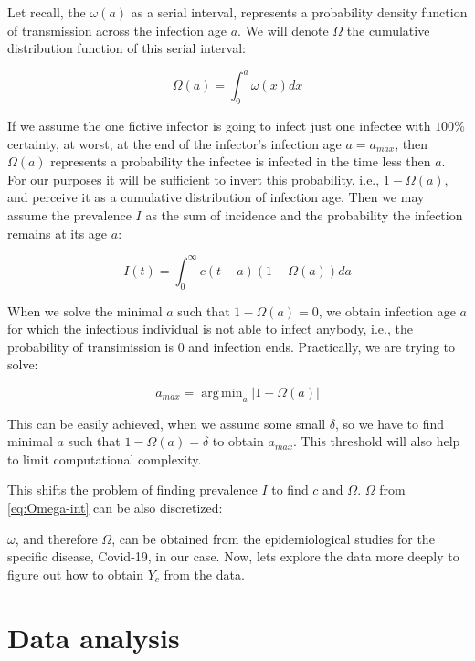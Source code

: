 \documentclass[
  digital, %
  oneside, %
  lof,     %
  lot,     %
]{fithesis4}
\DeclareMathOperator*{\argmin}{arg\,min}
\begin{document}
Let recall, the $\omega(a)$ as a serial interval, represents
a probability density function of transmission across
the infection age $a$.
We will denote $\Omega$ the cumulative distribution function
of this serial interval:

\begin{equation}\label{eq:Omega-int}
  \Omega(a) = \int_{0}^a \omega(x) dx
\end{equation}

If we assume the one fictive infector is going to infect
just one infectee with $100\%$ certainty, at worst, at the
end of the infector's infection age $a = a_{max}$, then
$\Omega(a)$ represents a probability the infectee is infected
in the time less then $a$.
For our purposes it will be sufficient to invert this probability,
i.e., $1 - \Omega(a)$, and perceive it as a cumulative distribution
of infection age. Then we may assume the prevalence $I$ as the sum
of incidence and the probability the infection remains at its
age $a$:

\begin{equation}\label{eq:prevalence-int}
  I(t) = \int_0^{\infty} c(t - a) (1 - \Omega(a)) da
\end{equation}

When we solve the minimal $a$ such
that $1 - \Omega(a) = 0$, we obtain infection age $a$ for which
the infectious individual is not able
to infect anybody, i.e., the probability of transimission
is $0$ and infection ends.
Practically, we are trying to solve:

\begin{equation}
  a_{max} = \argmin_a \left| 1 - \Omega(a) \right|
\end{equation}

This can be easily achieved, when we assume some small $\delta$,
so we have to find minimal $a$ such that $1 - \Omega(a) = \delta$
to obtain $a_{max}$. This threshold will also help to limit
computational complexity.

This shifts the problem of finding prevalence $I$ to find
$c$ and $\Omega$. $\Omega$ from \eqref{eq:Omega-int} can 
be also discretized:

$\omega$, and therefore $\Omega$, can be obtained from the epidemiological
studies for the specific disease, Covid-19, in our case.
Now, lets explore the data more deeply to figure out how
to obtain $Y_c$ from the data.


\section{Data analysis}
\end{document}
